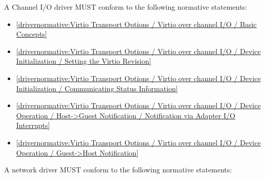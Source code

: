 \label{sec:Conformance / Driver Conformance / Channel I/O Driver Conformance}

A Channel I/O driver MUST conform to the following normative statements:

\begin{itemize}
\item \ref{drivernormative:Virtio Transport Options / Virtio over channel I/O / Basic Concepts}
\item \ref{drivernormative:Virtio Transport Options / Virtio over channel I/O / Device Initialization / Setting the Virtio Revision}
\item \ref{drivernormative:Virtio Transport Options / Virtio over channel I/O / Device Initialization / Communicating Status Information}
\item \ref{drivernormative:Virtio Transport Options / Virtio over channel I/O / Device Operation / Host->Guest Notification / Notification via Adapter I/O Interrupts}
\item \ref{drivernormative:Virtio Transport Options / Virtio over channel I/O / Device Operation / Guest->Host Notification}
\end{itemize}

\label{sec:Conformance / Driver Conformance / Network Driver Conformance}

A network driver MUST conform to the following normative statements:

